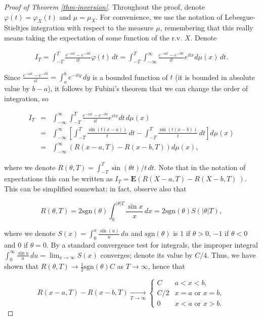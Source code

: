 \documentclass[11pt]{report}
\theoremstyle{plain}
\theoremstyle{definition}
\begin{document}
\begin{proof}[Proof of Theorem \ref{thm-inversion}]
Throughout the proof, denote $\varphi(t)=\varphi_X(t)$
and $\mu=\mu_X$. For convenience, we use the notation
of Lebesgue-Stieltjes integration with respect to the
measure $\mu$, remembering that this really means
taking the expectation of some function of the r.v.
$X$. Denote

\begin{align*}
\tag{22}\label{eq:inversionproof}
I_T = \int_{-T}^T \frac{e^{-i a t}-e^{-i b t}}{it} \varphi(t)\,dt
= \int_{-T}^T \int_{-\infty}^\infty \frac{e^{-i a t}-e^{-i b t}}{it} e^{itx}d\mu(x)\,dt.
\end{align*}

Since
$\frac{e^{-i a t}-e^{-i b t}}{it} = \int_a^b e^{-i t
y}\,dy$
is a bounded function of $t$ (it is bounded in
absolute value by $b-a$), it follows by Fubini's
theorem that we can change the order of integration,
so

\begin{eqnarray*}
I_T&=& \int_{-\infty}^\infty \int_{-T}^T \frac{e^{-i a t}-e^{-i b t}}{it} e^{itx} dt\,d\mu(x) \\
&=&
\int_{-\infty}^\infty \left[ \int_{-T}^T \frac{\sin(t(x-a))}{t}\,dt-\int_{-T}^T \frac{\sin(t(x-b))}{t}\,dt \right]d\mu(x) \\
&=& \int_{-\infty}^\infty \left( R(x-a,T)-R(x-b,T) \right) d\mu(x),
\end{eqnarray*}

where we denote
$R(\theta, T) = \int_{-T}^T \sin(\theta t)/t\,dt$.
Note that in the notation of expectations this can be
written as
$I_T = \mathbf{E}\left( R(X-a,T)-R(X-b,T)\ \right)$.
This can be simplified somewhat; in fact, observe also
that

\[
R(\theta,T)= 2\textrm{sgn}(\theta) \int_0^{|\theta|T} \frac{\sin x}{x}\,dx = 2 \textrm{sgn}(\theta) S(|\theta| T),
\]

where we denote
$S(x) = \int_0^x \frac{\sin(u)}{u}\,du$ and
$\textrm{sgn}(\theta)$ is $1$ if $\theta>0$, $-1$ if
$\theta<0$ and $0$ if $\theta=0$. By a standard
convergence test for integrals, the improper integral
$\int_0^\infty \frac{\sin u}{u}\,du =
\lim_{x\to\infty}S(x)$
converges; denote its value by $C/4$. Thus, we have
shown that
$R(\theta,T)\to \frac12\textrm{sgn}(\theta) C$ as
$T\to \infty$, hence that

\[
R(x-a,T)-R(x-b,T) \xrightarrow[T\to\infty]{} \begin{cases}
C & a<x<b, \\
C/2 & x=a\textrm{ or }x=b, \\
0 & x<a\textrm{ or }x>b.
\end{cases}
\]


\end{proof}
\end{document}

